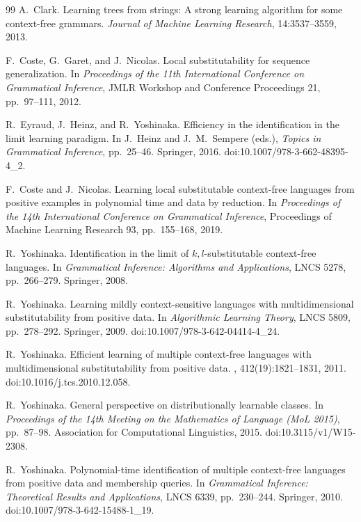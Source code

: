 \documentclass[11pt]{article}
\numberwithin{equation}{section}
\theoremstyle{plain}
\theoremstyle{definition}
\theoremstyle{remark}
\theoremstyle{plain}
\begin{document}
\begin{thebibliography}{99}
A.~Clark.
\newblock Learning trees from strings: A strong learning algorithm for some context-free grammars.
\newblock \emph{Journal of Machine Learning Research}, 14:3537--3559, 2013.

F.~Coste, G.~Garet, and J.~Nicolas.
\newblock Local substitutability for sequence generalization.
\newblock In {\em Proceedings of the 11th International Conference on
Grammatical Inference}, JMLR Workshop and Conference Proceedings 21,
pp.~97--111, 2012.

R.~Eyraud, J.~Heinz, and R.~Yoshinaka.
\newblock Efficiency in the identification in the limit learning paradigm.
\newblock In J.~Heinz and J.~M.~Sempere (eds.), {\em Topics in Grammatical
Inference}, pp.~25--46. Springer, 2016.
\newblock doi:10.1007/978-3-662-48395-4\_2.

F.~Coste and J.~Nicolas.
\newblock Learning local substitutable context-free languages from positive
examples in polynomial time and data by reduction.
\newblock In {\em Proceedings of the 14th International Conference on
Grammatical Inference}, Proceedings of Machine Learning Research 93,
pp.~155--168, 2019.

R.~Yoshinaka.
\newblock Identification in the limit of $k,l$-substitutable context-free
languages.
\newblock In {\em Grammatical Inference: Algorithms and Applications},
LNCS 5278, pp.~266--279. Springer, 2008.

R.~Yoshinaka.
\newblock Learning mildly context-sensitive languages with multidimensional
 substitutability from positive data.
\newblock In {\em Algorithmic Learning Theory}, LNCS 5809, pp.~278--292.
 Springer, 2009.
\newblock doi:10.1007/978-3-642-04414-4\_24.

R.~Yoshinaka.
\newblock Efficient learning of multiple context-free languages with
multidimensional substitutability from positive data.
, 412(19):1821--1831, 2011.
\newblock doi:10.1016/j.tcs.2010.12.058.

R.~Yoshinaka.
\newblock General perspective on distributionally learnable classes.
\newblock In \emph{Proceedings of the 14th Meeting on the Mathematics
of Language (MoL 2015)}, pp.~87--98.
Association for Computational Linguistics, 2015.
\newblock doi:10.3115/v1/W15-2308.

R.~Yoshinaka.
\newblock Polynomial-time identification of multiple context-free languages
from positive data and membership queries.
\newblock In {\em Grammatical Inference: Theoretical Results and Applications},
LNCS 6339, pp.~230--244. Springer, 2010.
\newblock doi:10.1007/978-3-642-15488-1\_19.


\end{thebibliography}
\end{document}
